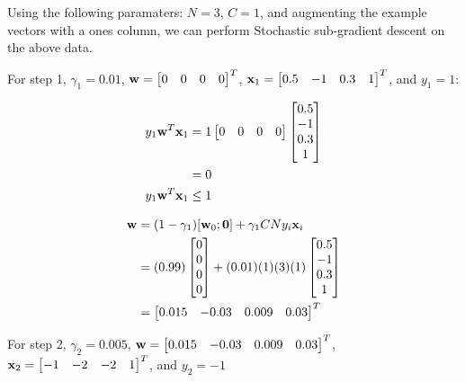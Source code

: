 \documentclass[12pt, fullpage,letterpaper]{article}
\begin{document}
\begin{enumerate}
	Using the following paramaters: $N=3$, $C=1$, and augmenting the example vectors with a ones column, we can perform Stochastic sub-gradient descent on the above data. 
	
	For step 1, $\gamma_1 = 0.01$, ${\bf w} = \begin{bmatrix}0 & 0 & 0 & 0\end{bmatrix}^T$, ${\bf x}_1 = \begin{bmatrix}0.5 &  -1 &  0.3 &  1\end{bmatrix}^T$, and $y_1=1$:
	
	\begin{align*}
		y_1 {\bf w}^T {\bf x}_1 &= 1 \begin{bmatrix}0 & 0 & 0 & 0\end{bmatrix} \begin{bmatrix}0.5 \\ -1 \\ 0.3 \\ 1\end{bmatrix}  \\
			&= 0 \\
		y_1 {\bf w}^T {\bf x}_1 &\le 1
	\end{align*}	
	
	\begin{align*}
		{\bf w} &= (1 - \gamma_1) [{\bf w}_0; {\bf 0}] + \gamma_1 C N y_i {\bf x}_i \\
			&= (0.99) \begin{bmatrix}0 \\ 0 \\ 0 \\ 0\end{bmatrix} + (0.01)(1)(3)(1) \begin{bmatrix}0.5 \\ -1 \\ 0.3 \\ 1\end{bmatrix} \\
			&= \begin{bmatrix}0.015 & -0.03 & 0.009 & 0.03\end{bmatrix}^T
	\end{align*}
	
	For step 2, $\gamma_2 = 0.005$, ${\bf w} = \begin{bmatrix}0.015 & -0.03 & 0.009 & 0.03\end{bmatrix}^T$, ${\bf x}_2 = \begin{bmatrix}-1 &  -2 &  -2 &  1\end{bmatrix}^T$, and $y_2=-1$
	
	
	

\end{enumerate}
\end{document}

